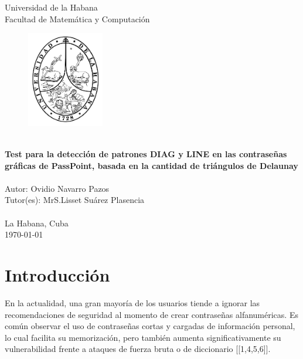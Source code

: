 \documentclass[12pt]{report}
\begin{document}
\begin{titlepage}
    \centering
    {\Huge {Universidad de la Habana}}\\[1cm]
    {\Huge {Facultad de Matemática y Computación }}\\[0.5cm]
 
    \begin{figure}[h]
    	\centering
    	\includegraphics[width=0.3\textwidth]{logoUH.png}
    \end{figure}
    {\noindent\hrulefill}\\[0.2cm]
    
    {\Large\textbf{{Test para la detección de patrones DIAG y LINE  en las contraseñas gráficas de PassPoint, basada en la cantidad de triángulos de Delaunay }}}\\[0.1cm]
    {\noindent\hrulefill}\\[1.0cm]
    
    
 
    
    {\Large {Autor: Ovidio Navarro Pazos}}\\[2cm]
   	{\Large {Tutor(es): MrS.Lisset Suárez Plasencia}}\\
   	\\[2.0cm]
   	
   	{\large{La Habana, Cuba}}\\
    {\large  \today}
\end{titlepage}

\tableofcontents
\newpage
\listoffigures
\newpage
\listoftables

\chapter*{Introducción}
\hypertarget{introduccion}{}


	En la actualidad, una gran mayoría de los usuarios tiende a ignorar las recomendaciones de seguridad al momento de crear contraseñas alfanuméricas. Es común observar el uso de contraseñas cortas y cargadas de información personal, lo cual facilita su memorización, pero también aumenta significativamente su vulnerabilidad frente a ataques de fuerza bruta o de diccionario [[1,4,5,6]].
	
\end{document}
